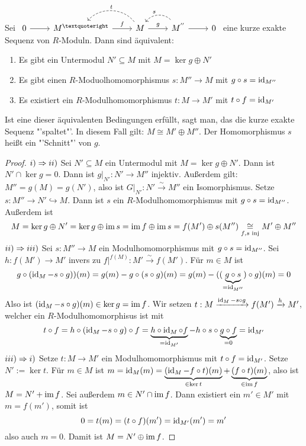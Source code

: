 \begin{sa}\label{2.2}
	Sei $\begin{tikzcd}
	0  \arrow{r} & M^{’} \arrow{r}{f} & M \arrow{r}{g}\arrow[bend right = 50,swap, dashed]{l}{t} & M^{''}\arrow[bend right = 50,swap, dashed]{l}{s} \arrow{r} & 0
	\end{tikzcd}$ eine kurze exakte Sequenz von $R$-Moduln. Dann sind äquivalent:
	\begin{enumerate}[label= \roman*)]
		\item Es gibt ein Untermodul $N'\subseteq M$ mit $M= \ker g \oplus N'$
		\item Es gibt einen $R$-Moduolhomomorphismus $s:M''\to M$ mit $g \circ s = \operatorname{id}_{M''}$
		\item Es existiert ein $R$-Modulhomomorphismus $t:M \to M'$ mit $t\circ f = \operatorname{id}_{M'}$
	\end{enumerate}
	Ist eine dieser äquivalenten Bedingungen erfüllt, sagt man, das die kurze exakte Sequenz "'spaltet"'. In diesem Fall gilt: $M \cong M' \oplus M''$. Der Homomorphismus $s$ heißt ein "'Schnitt"' von $g$.
\end{sa}
\begin{proof}
	$i) \Rightarrow ii)$ Sei $N'\subseteq M$ ein Untermodul mit $M= \ker g \oplus N'$. Dann ist $N'\cap \ker g = 0$. Dann ist $g\big|_{N'} : N' \to M''$ injektiv. Außerdem gilt: $M''= g(M) = g(N')$, also ist $G\big|_{N'} : N' \overset{\sim}{\longrightarrow} M''$ ein Isomorphismus. Setze $s:M'' \to N' \hookrightarrow M$. Dann ist $s$ ein $R$-Modulhomomorphismus mit $g\circ s = \operatorname{id}_{M''}$. Außerdem ist $$M= \ker g \oplus N' = \ker g \oplus \operatorname{im} s = \operatorname{im} f \oplus \operatorname{im} s = f(M') \oplus s(M'') \underset{f,s\text{ inj}}{\cong} M' \oplus M''$$
	$ii) \Rightarrow iii)$ Sei $s:M'' \to M$ ein Modulhomomorphismus mit $g\circ s= \operatorname{id}_{M''}$. Sei $h:f(M') \to M'$ invers zu $f\big|^{f(M)}: M' \overset{\sim}{\longrightarrow} f(M')$. Für $m\in M$ ist 
	$$g\circ (\operatorname{id}_M - s\circ g))(m) = g(m) - g\circ (s\circ g)(m) = g(m) - ((\underbrace{g\circ s}_{=\operatorname{id}_{M''}}) \circ g)(m) = 0$$
	Also ist $(\operatorname{id}_{M} - s\circ g)(m) \in \ker g = \operatorname{im} f$. Wir setzen $t:M \xrightarrow{\operatorname{id}_M - s\circ g} f(M') \xrightarrow{h} M'$, welcher ein $R$-Modulhomomorphisus ist mit 
	$$t\circ f = h\circ (\operatorname{id}_M - s\circ g)\circ f = \underbrace{h\circ \operatorname{id}_M \circ f}_{=\operatorname{id}_{M'}} - h\circ s \circ \underbrace{g\circ f}_{=0} = \operatorname{id}_{M'}$$
	$iii)\Rightarrow i)$ Setze $t:M\to M'$ ein Modulhomomorphismus mit $t\circ f = \operatorname{id}_{M'}$. Setze $N':= \ker t$. Für $m\in M$ ist $m=\operatorname{id}_M(m) = \underbrace{(\operatorname{id}_M- f\circ t)(m)}_{\in \ker t} + \underbrace{(f\circ t)(m)}_{\in \operatorname{im} f}$, also ist $M= N' + \operatorname{im} f$. Sei außerdem $m\in N' \cap \operatorname{im} f$. Dann existiert ein $m'\in M'$ mit $m= f(m')$, somit ist
	$$0 =t(m) = (t\circ f)(m') = \operatorname{id}_{M'}(m') = m'$$
	also auch $m=0$. Damit ist $M= N' \oplus \operatorname{im} f$.
\end{proof}
